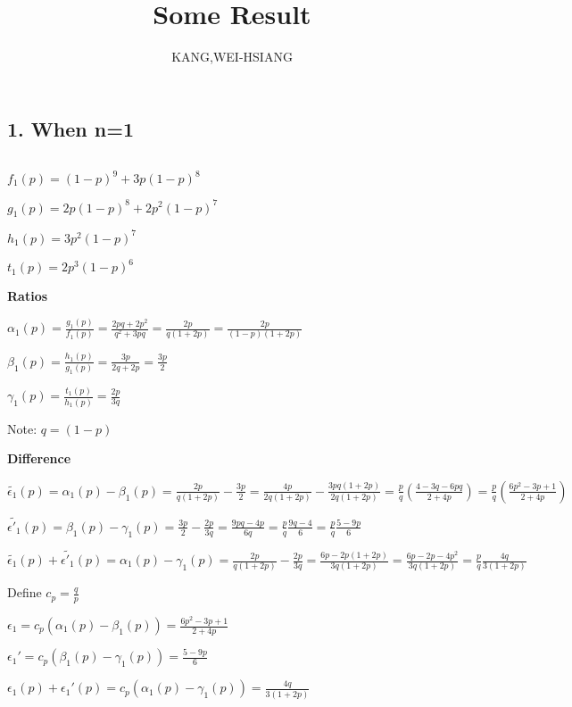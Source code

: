 

\usepackage[a4paper,margin=1in]{geometry}



\title{Some Result}
\author{KANG,WEI-HSIANG}
\date{}

\maketitle

\subsection*{1. When n=1}$ $

$f_1(p) = (1-p)^9 + 3p(1-p)^8$

$g_1(p) = 2p(1-p)^8 + 2p^2(1-p)^7$

$h_1(p) = 3p^2(1-p)^7$

$t_1(p) = 2p^3(1-p)^6$

\textbf{Ratios}

$\alpha_1(p)=\frac{g_1(p)}{f_1(p)} = \frac{2pq + 2p^2}{q^2+3pq} = \frac{2p}{q(1+2p)} = \frac{2p}{(1-p)(1+2p)}$

$\beta_1(p)=\frac{h_1(p)}{g_1(p)}=\frac{3p}{2q+2p}=\frac{3p}{2}$

$\gamma_1(p)=\frac{t_1(p)}{h_1(p)}=\frac{2p}{3q}$

Note: $q = (1-p)$

\textbf{Difference}

$\tilde{\epsilon_1}(p) = \alpha_1(p)-\beta_1(p)=\frac{2p}{q(1+2p)}-\frac{3p}{2} 
= \frac{4p}{2q(1+2p)} - \frac{3pq(1+2p)}{2q(1+2p)} = \frac{p}{q}(\frac{4-3q-6pq}{2+4p})
= \frac{p}{q}(\frac{6p^2-3p+1}{2+4p})$

$\tilde{\epsilon'_1}(p) = \beta_1(p) - \gamma_1(p) = \frac{3p}{2} - \frac{2p}{3q}
= \frac{9pq - 4p}{6q} = \frac{p}{q}\frac{9q-4}{6}=\frac{p}{q}\frac{5-9p}{6}$


$\tilde{\epsilon_1}(p) + \tilde{\epsilon'_1}(p) = \alpha_1(p)-\gamma_1(p) = \frac{2p}{q(1+2p)} - \frac{2p}{3q} 
= \frac{6p - 2p(1+2p)}{3q(1+2p)} = \frac{6p - 2p - 4p^2}{3q(1+2p)} = \frac{p}{q}\frac{4q}{3(1+2p)}$

Define $c_p = \frac{q}{p}$

$\epsilon_1 = c_p(\alpha_1(p) - \beta_1(p)) = \frac{6p^2 - 3p + 1}{2 + 4p}$

$\epsilon_1' = c_p(\beta_1(p) - \gamma_1(p)) = \frac{5-9p}{6}$

$\epsilon_1(p) + \epsilon_1'(p) = c_p(\alpha_1(p) - \gamma_1(p)) = \frac{4q}{3(1+2p)}$

